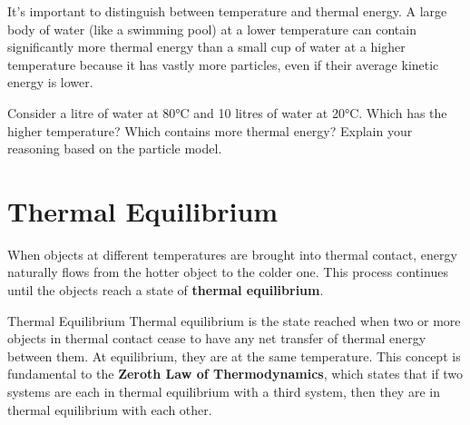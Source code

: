 It's important to distinguish between temperature and thermal energy. A large body of water (like a swimming pool) at a lower temperature can contain significantly more thermal energy than a small cup of water at a higher temperature because it has vastly more particles, even if their average kinetic energy is lower.

\begin{stopandthink}
Consider a litre of water at 80°C and 10 litres of water at 20°C. Which has the higher temperature? Which contains more thermal energy? Explain your reasoning based on the particle model.
\end{stopandthink}


\FloatBarrier

\section{Thermal Equilibrium}
\label{sec:thermal_equilibrium}
\FloatBarrier

When objects at different temperatures are brought into thermal contact, energy naturally flows from the hotter object to the colder one. This process continues until the objects reach a state of \textbf{thermal equilibrium}.

\begin{keyconcept}{Thermal Equilibrium}
Thermal equilibrium is the state reached when two or more objects in thermal contact cease to have any net transfer of thermal energy between them. At equilibrium, they are at the same temperature. This concept is fundamental to the \textbf{Zeroth Law of Thermodynamics}, which states that if two systems are each in thermal equilibrium with a third system, then they are in thermal equilibrium with each other.
\end{keyconcept}

